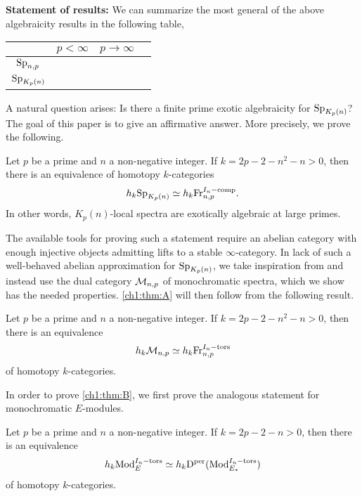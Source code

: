 \textbf{Statement of results:} We can summarize the most general of the above algebraicity results in the following table,
\vspace{-10pt}
\begin{table}[h]
    \centering
    \begin{tabular}{c|ccc}
        & $p<\infty $ & $p\rightarrow \infty$ \\
        \hline 
        $\mathrm{Sp}_{n,p}$& \cite{patchkoria-pstragowski_2021} & \cite{barthel-schlank-stapleton_2020} \\
        $\mathrm{Sp}_{{K_p(n)}}$ &  & \cite{barthel-schlank-stapleton_2021} 
    \end{tabular}
\end{table}

A natural question arises: Is there a finite prime exotic algebraicity for $\mathrm{Sp}_{{K_p(n)}}$? The goal of this paper is to give an affirmative answer. More precisely, we prove the following. 

\begin{introthm}
    \label{ch1:thm:A}
    Let $p$ be a prime and $n$ a non-negative integer. If $k=2p-2-n^2-n>0$, then there is an equivalence of homotopy $k$-categories 
    \[h_k \mathrm{Sp}_{{K_p(n)}}\simeq h_k \mathrm{Fr}_{n,p}^{I_n-\mathrm{comp}}.\]
    In other words, $K_p(n)$-local spectra are exotically algebraic at large primes. 
\end{introthm}

The available tools for proving such a statement require an abelian category with enough injective objects admitting lifts to a stable $\infty$-category. In lack of such a well-behaved abelian approximation for $\mathrm{Sp}_{{K_p(n)}}$, we take inspiration from \cite{barthel-schlank-stapleton_2021} and instead use the dual category $\mathcal{M}_{n,p}$ of monochromatic spectra, which we show has the needed properties. \cref{ch1:thm:A} will then follow from the following result. 

\begin{introthm}
    \label{ch1:thm:B}
    Let $p$ be a prime and $n$ a non-negative integer. If $k=2p-2-n^2-n>0$,  then there is an equivalence 
    \[h_k \mathcal{M}_{n,p}\simeq h_k \mathrm{Fr}_{n,p}^{I_n-\mathrm{tors}}\]
    of homotopy $k$-categories.
\end{introthm}

In order to prove \cref{ch1:thm:B}, we first prove the analogous statement for monochromatic $E$-modules. 
    
\begin{introthm}
    \label{ch1:thm:C}
    Let $p$ be a prime and $n$ a non-negative integer. If $k=2p-2-n>0$,  then there is an equivalence
    \[h_k \mathrm{Mod}_{E}^{I_n-\mathrm{tors}}\simeq h_k \mathrm{D}^{\mathrm{per}}(\mathrm{Mod}_{E_*}^{I_n-\mathrm{tors}})\]
    of homotopy $k$-categories.
\end{introthm}


